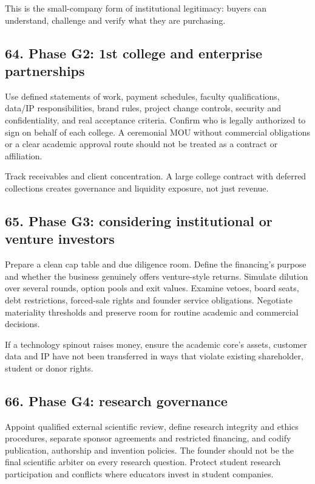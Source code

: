 This is the small-company form of institutional legitimacy: buyers can understand, challenge and verify what they are purchasing.

\subsection{64. Phase G2: 1st college and enterprise partnerships}

Use defined statements of work, payment schedules, faculty qualifications, data/IP responsibilities, brand rules, project change controls, security and confidentiality, and real acceptance criteria. Confirm who is legally authorized to sign on behalf of each college. A ceremonial MOU without commercial obligations or a clear academic approval route should not be treated as a contract or affiliation.

Track receivables and client concentration. A large college contract with deferred collections creates governance and liquidity exposure, not just revenue.

\subsection{65. Phase G3: considering institutional or venture investors}

Prepare a clean cap table and due diligence room. Define the financing's purpose and whether the business genuinely offers venture-style returns. Simulate dilution over several rounds, option pools and exit values. Examine vetoes, board seats, debt restrictions, forced-sale rights and founder service obligations. Negotiate materiality thresholds and preserve room for routine academic and commercial decisions.

If a technology spinout raises money, ensure the academic core's assets, customer data and IP have not been transferred in ways that violate existing shareholder, student or donor rights.

\subsection{66. Phase G4: research governance}

Appoint qualified external scientific review, define research integrity and ethics procedures, separate sponsor agreements and restricted financing, and codify publication, authorship and invention policies. The founder should not be the final scientific arbiter on every research question. Protect student research participation and conflicts where educators invest in student companies.

